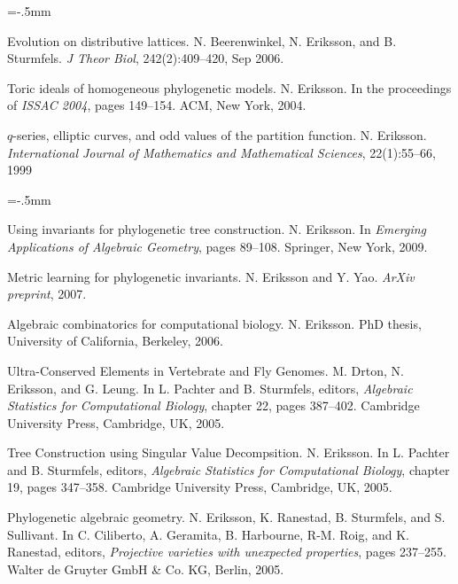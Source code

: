 \documentclass[11pt]{article}
\newcommand{\marginlabel}[1]{\bigskip\noindent{\textsf{\textbf{#1}}}\nopagebreak}
\newenvironment{papers}[1][1]
	{\vspace{-2ex}\leftmargini=16.1mm%
	 \begin{revnumerate}[{#1}]\itemsep=-.5mm}
	{\end{revnumerate}\vspace{-2ex}}
\def\paper{\item}
\def\paperyear#1{\item[\addtocounter{enumi}{-1}%
		 {\makebox[0mm][r]{\makebox[14mm]{#1\hfill\arabic{enumi}.}}}]}
\begin{document}
\begin{papers}[25]
            \paper
        Evolution on distributive lattices.
        N. Beerenwinkel, N. Eriksson, and B. Sturmfels.
        \textit{J Theor Biol}, 242(2):409--420, Sep 2006.

     
                \paperyear{2004}
        Toric ideals of homogeneous phylogenetic models.
        N. Eriksson.
        In the proceedings of \textit{ISSAC 2004}, pages 149--154. ACM, New York, 2004.

     
                \paperyear{1999}
        $q$-series, elliptic curves, and odd values of the partition function.
        N. Eriksson.
        \textit{International Journal of Mathematics and Mathematical Sciences}, 22(1):55--66, 1999

    
\end{papers}

\vspace{-2.25ex}
\marginlabel{\sf Theses and book chapters}%

\begin{papers}[6]%

 
            \paperyear{2009}
        Using invariants for phylogenetic tree construction.
        N. Eriksson.
        In \textit{Emerging Applications of Algebraic Geometry}, pages 89--108. Springer, New York, 2009.
     
            \paperyear{2007}
        Metric learning for phylogenetic invariants.
        N. Eriksson and Y. Yao.
        \textit{ArXiv preprint}, 2007.
     
            \paperyear{2006}
        Algebraic combinatorics for computational biology.
        N. Eriksson.
        PhD thesis, University of California, Berkeley, 2006.
     
            \paperyear{2005}
        Ultra-Conserved Elements in Vertebrate and Fly Genomes.
        M. Drton, N. Eriksson, and G. Leung.
        In L. Pachter and B. Sturmfels, editors, \textit{Algebraic Statistics for Computational Biology}, chapter 22, pages 387--402. Cambridge University Press, Cambridge, UK, 2005.
            \paper
        Tree Construction using Singular Value Decompsition.
        N. Eriksson.
        In L. Pachter and B. Sturmfels, editors, \textit{Algebraic Statistics for Computational Biology}, chapter 19, pages 347--358. Cambridge University Press, Cambridge, UK, 2005.
            \paper
        Phylogenetic algebraic geometry.
        N. Eriksson,  K. Ranestad, B. Sturmfels, and S. Sullivant.
        In C. Ciliberto, A. Geramita, B. Harbourne, R-M. Roig, and K. Ranestad, editors, \textit{Projective varieties with unexpected properties}, pages 237--255. Walter de Gruyter GmbH \& Co. KG, Berlin, 2005.
    \end{papers}
\end{document}
